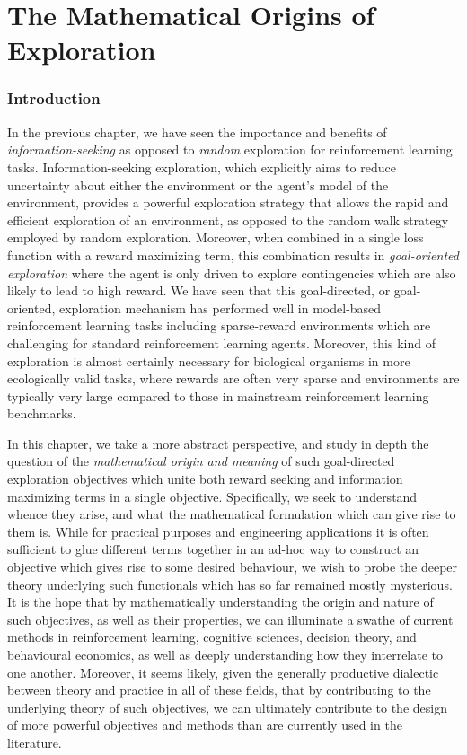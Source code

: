 
\chapter{The Mathematical Origins of Exploration}

\subsection{Introduction} 

In the previous chapter, we have seen the importance and benefits of \emph{information-seeking} as opposed to \emph{random} exploration for reinforcement learning tasks. Information-seeking exploration, which explicitly aims to reduce uncertainty about either the environment or the agent's model of the environment, provides a powerful exploration strategy that allows the rapid and efficient exploration of an environment, as opposed to the random walk strategy employed by random exploration. Moreover, when combined in a single loss function with a reward maximizing term, this combination results in \emph{goal-oriented exploration} where the agent is only driven to explore contingencies which are also likely to lead to high reward. We have seen that this goal-directed, or goal-oriented, exploration mechanism has performed well in model-based reinforcement learning tasks including sparse-reward environments which are challenging for standard reinforcement learning agents. Moreover, this kind of exploration is almost certainly necessary for biological organisms in more ecologically valid tasks, where rewards are often very sparse and environments are typically very large compared to those in mainstream reinforcement learning benchmarks.

In this chapter, we take a more abstract perspective, and study in depth the question of the \emph{mathematical origin and meaning} of such goal-directed exploration objectives which unite both reward seeking and information maximizing terms in a single objective. Specifically, we seek to understand whence they arise, and what the mathematical formulation which can give rise to them is. While for practical purposes and engineering applications it is often sufficient to glue different terms together in an ad-hoc way to construct an objective which gives rise to some desired behaviour, we wish to probe the deeper theory underlying such functionals which has so far remained mostly mysterious. It is the hope that by mathematically understanding the origin and nature of such objectives, as well as their properties, we can illuminate a swathe of current methods in reinforcement learning, cognitive sciences, decision theory, and behavioural economics, as well as deeply understanding how they interrelate to one another. Moreover, it seems likely, given the generally productive dialectic between theory and practice in all of these fields, that by contributing to the underlying theory of such objectives, we can ultimately contribute to the design of more powerful objectives and methods than are currently used in the literature.

